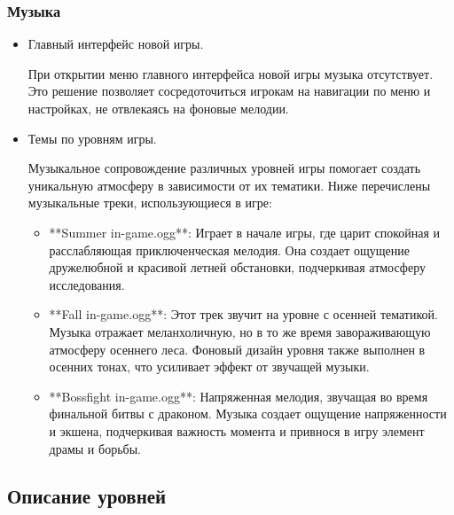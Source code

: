 \documentclass{article}
\begin{document}
\subsubsection{Музыка}
\begin{itemize}
    \item Главный интерфейс новой игры.
    
При открытии меню главного интерфейса новой игры музыка отсутствует. Это решение позволяет сосредоточиться игрокам на навигации по меню и настройках, не отвлекаясь на фоновые мелодии.
    \item Темы по уровням игры.
    
Музыкальное сопровождение различных уровней игры помогает создать уникальную атмосферу в зависимости от их тематики. Ниже перечислены музыкальные треки, использующиеся в игре:
\begin{itemize}
    \item **Summer in-game.ogg**: Играет в начале игры, где царит спокойная и расслабляющая приключенческая мелодия. Она создает ощущение дружелюбной и красивой летней обстановки, подчеркивая атмосферу исследования.
    \item **Fall in-game.ogg**: Этот трек звучит на уровне с осенней тематикой. Музыка отражает меланхоличную, но в то же время завораживающую атмосферу осеннего леса. Фоновый дизайн уровня также выполнен в осенних тонах, что усиливает эффект от звучащей музыки.
    \item **Bossfight in-game.ogg**: Напряженная мелодия, звучащая во время финальной битвы с драконом. Музыка создает ощущение напряженности и экшена, подчеркивая важность момента и привнося в игру элемент драмы и борьбы.
\end{itemize}
\end{itemize}
\subsection{Описание уровней}
\end{document}
